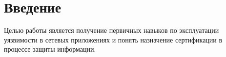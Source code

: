 \chapter{Введение}

Целью работы является получение первичных навыков по эксплуатации уязвимости в сетевых приложениях и понять назначение сертификации в процессе защиты информации.


